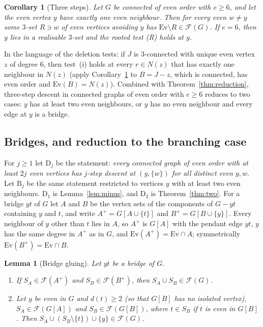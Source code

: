 \documentclass[11pt]{amsart}
\newtheorem{lemma}[theorem]{Lemma}
\newtheorem{corollary}[theorem]{Corollary}
\theoremstyle{definition}
\newcommand{\cF}{\mathcal F}
\newcommand{\Ev}{\mathrm{Ev}}
\begin{document}
\begin{corollary}[Three steps]\label{cor:three}
Let $G$ be connected of even order with $e\ge6$, and let the even vertex $y$ have exactly one even
neighbour. Then for every even $w\ne y$ some $3$-set $R\ni w$ of even vertices avoiding $y$ has
$\Ev\setminus R\in\cF(G)$. If $e=6$, then $y$ lies in a realisable $3$-set and the rooted test (R)
holds at $y$.
\end{corollary}

In the language of the deletion tests: if $J$ is $3$-connected with unique even vertex $z$ of degree
$6$, then test~(i) holds at every $r\in N(z)$ that has exactly one neighbour in $N(z)$ (apply
Corollary~\ref{cor:three} to $B=J-z$, which is connected, has even order and $\Ev(B)=N(z)$). Combined with
Theorem~\ref{thm:reduction}, three-step descent in connected graphs of even order with $e\ge6$
reduces to two cases: $y$ has at least two even neighbours, or $y$ has no even neighbour and every
edge at $y$ is a bridge.

\subsection*{Bridges, and reduction to the branching case}

For $j\ge1$ let $\mathrm{D}_j$ be the statement: \emph{every connected graph of even order with at
least $2j$ even vertices has $j$-step descent at $(y,\{w\})$ for all distinct even $y,w$}. Let
$\mathrm{B}_j$ be the same statement restricted to vertices $y$ with at least two even neighbours.
$\mathrm{D}_1$ is Lemma~\ref{lem:minus}, and $\mathrm{D}_2$ is Theorem~\ref{thm:two}. For a bridge
$yt$ of $G$ let $A$ and $B$ be the vertex sets of the components of $G-yt$ containing $y$ and $t$, and
write $A^+=G[A\cup\{t\}]$ and $B^+=G[B\cup\{y\}]$. Every neighbour of $y$ other than $t$ lies in $A$,
so $A^+$ is $G[A]$ with the pendant edge $yt$, $y$ has the same degree in $A^+$ as in $G$, and
$\Ev(A^+)=\Ev\cap A$; symmetrically $\Ev(B^+)=\Ev\cap B$.

\begin{lemma}[Bridge gluing]\label{lem:bridge}
Let $yt$ be a bridge of $G$.
\begin{enumerate}
\item If $S_A\in\cF(A^+)$ and $S_B\in\cF(B^+)$, then $S_A\cup S_B\in\cF(G)$.
\item Let $y$ be even in $G$ and $d(t)\ge2$ (so that $G[B]$ has no isolated vertex),
$S_A\in\cF(G[A])$ and $S_B\in\cF(G[B])$, where $t\in S_B$ if $t$ is
even in $G[B]$. Then $S_A\cup(S_B\setminus\{t\})\cup\{y\}\in\cF(G)$.
\end{enumerate}
\end{lemma}
\end{document}
